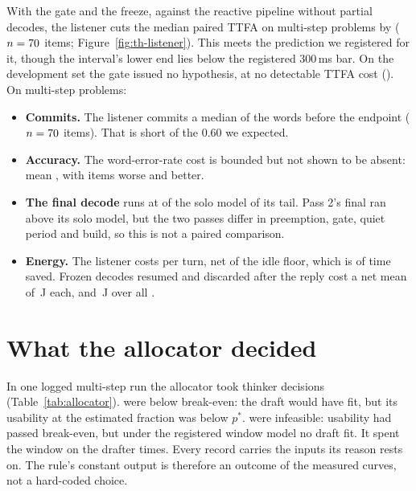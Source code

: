 With the gate and the freeze, against the reactive pipeline without partial
decodes, the listener cuts the median paired TTFA on multi-step problems by
\PthreeRed{} ($n=70$ items; Figure~\ref{fig:th-listener}). This meets
the prediction we registered for it, though the interval's lower end lies
below the registered 300\,ms bar. On the development set the gate issued no
hypothesis, at no detectable TTFA cost (\DevTTFA). On multi-step problems:
\begin{itemize}
\item \textbf{Commits.} The listener commits a median \WordsCommitted{} of
  the words before the endpoint ($n=70$ items). That is short of the
  0.60 we expected.
\item \textbf{Accuracy.} The word-error-rate cost is bounded but not shown to
  be absent: mean \PfourMean{} \PfourCI, with \PfourWorse{} items worse and
  \PfourBetter{} better.
\item \textbf{The final decode} runs at \PsixRatio{} of the solo model of its
  tail. Pass 2's final ran above its solo model, but the two passes differ
  in preemption, gate, quiet period and build, so this is not a paired
  comparison.
\item \textbf{Energy.} The listener costs \EnergyListenerr{} per turn, net of
  the idle floor, which is \SevenJms{} of time saved. Frozen decodes resumed
  and discarded after the reply cost a net mean of \StaleMean\,J each, and
  \StaleTotal\,J over all \StaleN.
\end{itemize}

\section{What the allocator decided}
\label{sec:decisions}



In one logged multi-step run the allocator took \AllocDecisions{} thinker
decisions (Table~\ref{tab:allocator}). \AllocBelow{} were below break-even:
the draft would have fit, but its usability at the estimated fraction was
below $p^\ast$. \AllocInfeasible{} were infeasible: usability had passed
break-even, but under the registered window model no draft fit. It spent the
window on the drafter \AllocSpends{} times. Every record carries the inputs
its reason rests on. The rule's constant output is therefore an outcome of
the measured curves, not a hard-coded choice.



